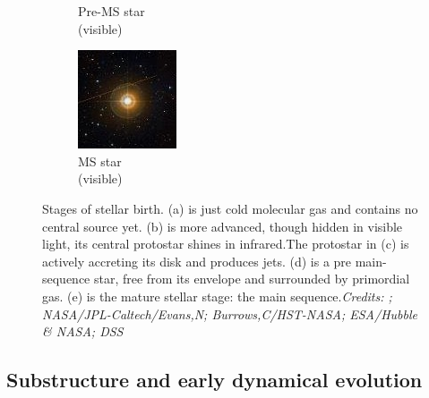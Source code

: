 \begin{figure}
\begin{subfigure}[b]{0.19\textwidth}
        \caption{Pre-MS star \\ \centering (visible)}
        \label{Fig:0_proto_4}
    \end{subfigure}  
        \begin{subfigure}[b]{0.19\textwidth}
        \includegraphics[width=\textwidth]{Figures/0_proto_5.jpg}
        \caption{MS star \\\centering (visible) }
        \label{Fig:0_proto_5}
    \end{subfigure}
     \caption{Stages of stellar birth. (a) is just cold molecular gas and contains no central source yet. (b) is more advanced, though hidden in visible light, its central protostar shines in infrared.The protostar in (c) is actively accreting its disk and produces jets. (d) is a pre main-sequence star, free from its envelope and surrounded by primordial gas. (e) is the mature stellar stage: the main sequence.\textit{Credits: \protect\cite{Kandori2005}; NASA/JPL-Caltech/Evans,N; Burrows,C/HST-NASA; ESA/Hubble \& NASA; DSS}}
     \label{Fig:0_protoevolution}
\end{figure}








\subsection{Substructure and early dynamical evolution}

